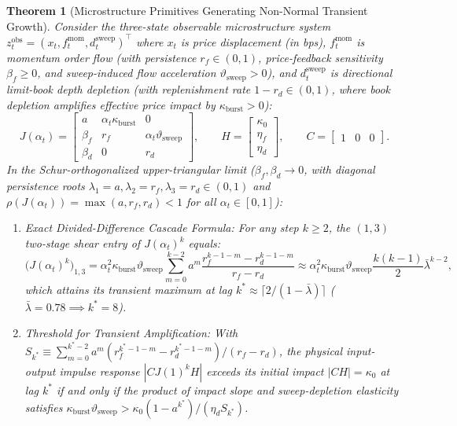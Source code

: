 \documentclass[11pt]{article}
\newtheorem{theorem}{Theorem}[section]
\theoremstyle{remark}
\begin{document}
\begin{theorem}[Microstructure Primitives Generating Non-Normal Transient Growth]
Consider the three-state observable microstructure system $z_t^{\text{obs}} = (x_t, f_t^{\text{mom}}, d_t^{\text{sweep}})^\top$ where $x_t$ is price displacement (in bps), $f_t^{\text{mom}}$ is momentum order flow (with persistence $r_f \in (0,1)$, price-feedback sensitivity $\beta_f \ge 0$, and sweep-induced flow acceleration $\vartheta_{\text{sweep}} > 0$), and $d_t^{\text{sweep}}$ is directional limit-book depth depletion (with replenishment rate $1 - r_d \in (0,1)$, where book depletion amplifies effective price impact by $\kappa_{\text{burst}} > 0$):
\begin{equation}
J(\alpha_t) = \begin{bmatrix}
a & \alpha_t \kappa_{\text{burst}} & 0 \\
\beta_f & r_f & \alpha_t \vartheta_{\text{sweep}} \\
\beta_d & 0 & r_d
\end{bmatrix}, \qquad H = \begin{bmatrix} \kappa_0 \\ \eta_f \\ \eta_d \end{bmatrix}, \qquad C = \begin{bmatrix} 1 & 0 & 0 \end{bmatrix}. \label{eq:j_primitives}
\end{equation}
In the Schur-orthogonalized upper-triangular limit ($\beta_f, \beta_d \to 0$, with diagonal persistence roots $\lambda_1 = a, \lambda_2 = r_f, \lambda_3 = r_d \in (0,1)$ and $\rho(J(\alpha_t)) = \max(a, r_f, r_d) < 1$ for all $\alpha_t \in [0,1]$):
\begin{enumerate}
    \item \emph{Exact Divided-Difference Cascade Formula:} For any step $k \ge 2$, the $(1,3)$ two-stage shear entry of $J(\alpha_t)^k$ equals:
    \begin{equation}
    \big(J(\alpha_t)^k\big)_{1,3} = \alpha_t^2 \kappa_{\text{burst}}\vartheta_{\text{sweep}} \sum_{m=0}^{k-2} a^m \frac{r_f^{k-1-m} - r_d^{k-1-m}}{r_f - r_d} \approx \alpha_t^2 \kappa_{\text{burst}}\vartheta_{\text{sweep}} \frac{k(k-1)}{2}\bar{\lambda}^{k-2}, \label{eq:shear_power}
    \end{equation}
    which attains its transient maximum at lag $k^* \approx \lceil 2 / (1 - \bar{\lambda}) \rceil$ ($\bar{\lambda} = 0.78 \implies k^* = 8$).
    \item \emph{Threshold for Transient Amplification:} With $S_{k^*} \equiv \sum_{m=0}^{k^*-2} a^m (r_f^{k^*-1-m} - r_d^{k^*-1-m})/(r_f - r_d)$, the physical input-output impulse response $|C J(1)^k H|$ exceeds its initial impact $|C H| = \kappa_0$ at lag $k^*$ if and only if the product of impact slope and sweep-depletion elasticity satisfies $\kappa_{\text{burst}}\vartheta_{\text{sweep}} > \kappa_0(1 - a^{k^*}) / (\eta_d S_{k^*})$.
\end{enumerate}
\end{theorem}
\end{document}
